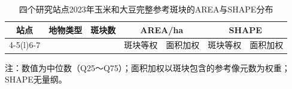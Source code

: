 \begin{table}[tbp]
\centering
\caption{四个研究站点2023年玉米和大豆完整参考斑块的AREA与SHAPE分布}
\label{tab:sec13_patch_distribution}
\begingroup
\songti{}
\setlength{\tabcolsep}{2pt}
\renewcommand{\arraystretch}{1.08}
\begin{tabular*}{\textwidth}{@{\extracolsep{\fill}}ccccccc@{}}
\toprule
\multirow{2}{*}{站点} & \multirow{2}{*}{地物类型} & \multirow{2}{*}{斑块数} & \multicolumn{2}{c}{AREA/ha} & \multicolumn{2}{c}{SHAPE} \\
\cmidrule(lr){4-5}\cmidrule(l){6-7}
 & & & 斑块等权 & 面积加权 & 斑块等权 & 面积加权 \\
\midrule

\bottomrule
\end{tabular*}
\par\nointerlineskip\vspace{3pt}
\raggedright 注：数值为中位数（Q25～Q75）；面积加权以斑块包含的参考像元数为权重；SHAPE无量纲。
\par
\endgroup
\end{table}
